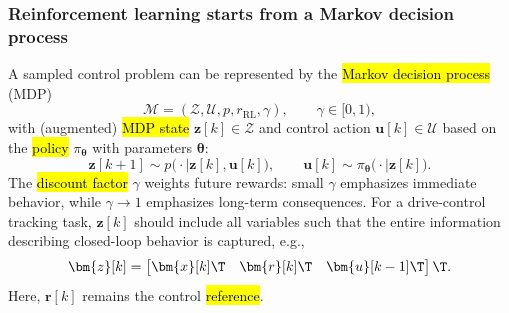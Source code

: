 \begin{frame}
	\frametitle{Reinforcement learning starts from a Markov decision process}
	A sampled control problem can be represented by the \hl{Markov decision process} (MDP)
	\begin{equation}
		\mathcal{M}=(\mathcal{Z},\mathcal{U},p,r_{\mathrm{RL}},\gamma),
		\qquad \gamma\in[0,1),
	\end{equation}\pause%
	with (augmented) \hl{MDP state} $\bm{z}[k]\in\mathcal{Z}$ and control action $\bm{u}[k]\in\mathcal{U}$ based on the \hl{policy} $\pi_{\bm{\theta}}$ with parameters $\bm{\theta}$:
	\begin{equation}
		\bm{z}[k+1]\sim p\bigl(\cdot\mid\bm{z}[k],\bm{u}[k]\bigr),
		\qquad
		\bm{u}[k]\sim\pi_{\bm{\theta}}\bigl(\cdot\mid\bm{z}[k]\bigr).
	\end{equation}\pause%
	The \hl{discount factor} $\gamma$ weights future rewards: small $\gamma$ emphasizes immediate behavior, while $\gamma\rightarrow 1$ emphasizes long-term consequences. \pause For a drive-control tracking task, $\bm{z}[k]$ should include all variables such that the entire information describing closed-loop behavior is captured, e.g.,
	\begin{equation}
		\bm{z}[k]
		=\begin{bmatrix}
			\bm{x}[k]\T & \bm{r}[k]\T & \bm{u}[k-1]\T
		\end{bmatrix}\T.
	\end{equation}\pause%
	Here, $\bm{r}[k]$ remains the control \hl{reference}.
\end{frame}

